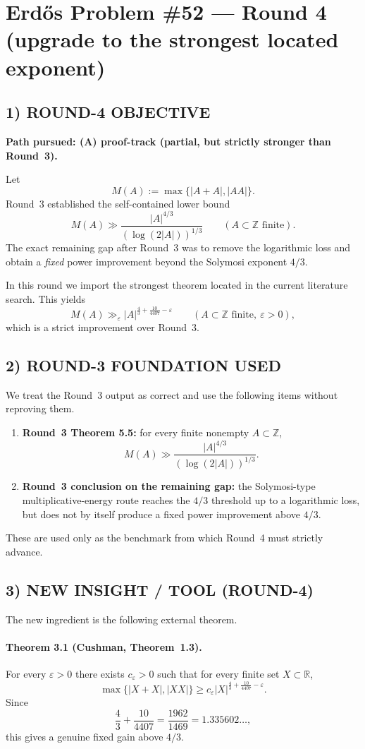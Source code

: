 \section{Erd\H{o}s Problem \#52 --- Round 4 (upgrade to the strongest located exponent)}

\subsection{1) ROUND-4 OBJECTIVE}
\textbf{Path pursued: (A) proof-track (partial, but strictly stronger than Round~3).}

Let
\[
M(A):=\max\{|A+A|,|AA|\}.
\]
Round~3 established the self-contained lower bound
\[
M(A)\gg \frac{|A|^{4/3}}{(\log(2|A|))^{1/3}}
\qquad (A\subset\mathbb Z\text{ finite}).
\]
The exact remaining gap after Round~3 was to remove the logarithmic loss and obtain a \emph{fixed} power improvement beyond the Solymosi exponent $4/3$.

In this round we import the strongest theorem located in the current literature search. This yields
\[
M(A)\gg_{\varepsilon} |A|^{\frac43+\frac{10}{4407}-\varepsilon}
\qquad (A\subset\mathbb Z\text{ finite},\ \varepsilon>0),
\]
which is a strict improvement over Round~3.

\subsection{2) ROUND-3 FOUNDATION USED}
We treat the Round~3 output as correct and use the following items without reproving them.
\begin{enumerate}
\item \textbf{Round~3 Theorem 5.5:} for every finite nonempty $A\subset\mathbb Z$,
\[
M(A)\gg \frac{|A|^{4/3}}{(\log(2|A|))^{1/3}}.
\]
\item \textbf{Round~3 conclusion on the remaining gap:} the Solymosi-type multiplicative-energy route reaches the $4/3$ threshold up to a logarithmic loss, but does not by itself produce a fixed power improvement above $4/3$.
\end{enumerate}
These are used only as the benchmark from which Round~4 must strictly advance.

\subsection{3) NEW INSIGHT / TOOL (ROUND-4)}
The new ingredient is the following external theorem.

\paragraph{Theorem 3.1 (Cushman, Theorem~1.3).}
For every $\varepsilon>0$ there exists $c_{\varepsilon}>0$ such that for every finite set $X\subset\mathbb R$,
\[
\max\{|X+X|,|XX|\}\ge c_{\varepsilon}|X|^{\frac43+\frac{10}{4407}-\varepsilon}.
\]
Since
\[
\frac43+\frac{10}{4407}=\frac{1962}{1469}=1.335602\ldots,
\]
this gives a genuine fixed gain above $4/3$.

